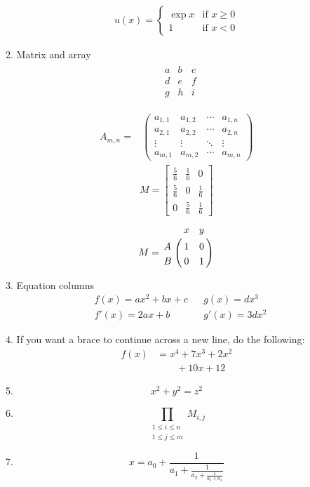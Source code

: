 \documentclass[12pt,a4paper]{article}
\begin{document}
\begin{enumerate}
\begin{enumerate}
	\begin{align*}
		u(x)=\begin{cases}
		\exp x & \text{if $x\geq 0$}\\
		1 &\text{if $x < 0$}\end{cases}
	\end{align*}
	\item Matrix and array
	\begin{align*}
	&\begin{matrix}
	a & b & c\\
	d & e & f\\
	g & h & i
	\end{matrix}
	\end{align*}
	
	\begin{align*}	
	A_{m,n} = 
	&\begin{pmatrix}
	a_{1,1} & a_{1,2} & \cdots & a_{1,n} \\
	a_{2,1} & a_{2,2} & \cdots & a_{2,n} \\
	\vdots  & \vdots  & \ddots & \vdots  \\
	a_{m,1} & a_{m,2} & \cdots & a_{m,n} 
	\end{pmatrix}
	\end{align*}
	\begin{align*}
	M=
		\begin{bmatrix}
		\frac{5}{6} & \frac{1}{6} & 0\\
		\frac{5}{6} & 0 & \frac{1}{6}\\
		0 & \frac{5}{6} & \frac{1}{6}
		\end{bmatrix}
	\end{align*}
	\begin{align*}
	M = \bordermatrix{~ & x & y \cr
		A & 1 & 0 \cr
		B & 0 & 1 \cr}
	\end{align*}
	\item Equation columns\\
	\begin{align*}
		&f(x)=ax^{2}+bx+c & &g(x)=dx^{3}\\
		&f'(x)=2ax+b & &g'(x)=3dx^{2}
	\end{align*}
	\item If you want a brace to continue across a new line, do the following:\\
	\begin{align}
	f(x) &= x^4 + 7x^3 + 2x^2 \nonumber \\
	&\qquad {} + 10x + 12
	\end{align}
	\item
	\begin{equation}
	\boxed{x^2+y^2 = z^2}
	\end{equation}	
\item
	\begin{equation}
	\prod_{\substack{
			1\le i \le n\\
			1\le j \le m}}
	M_{i,j}
	\end{equation}
	\item
	\begin{equation}
	x = a_0 + \frac{1}{a_1 + \frac{1}{a_2 + \frac{1}{a_3 + a_4}}}
	\end{equation}


\end{enumerate}
\end{enumerate}
\end{document}

